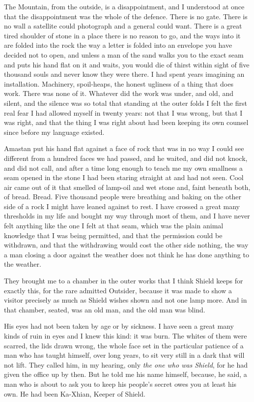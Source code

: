 The Mountain, from the outside, is a disappointment, and I understood at once that the disappointment was the whole of the defence. There is no gate. There is no wall a satellite could photograph and a general could want. There is a great tired shoulder of stone in a place there is no reason to go, and the ways into it are folded into the rock the way a letter is folded into an envelope you have decided not to open, and unless a man of the sand walks you to the exact seam and puts his hand flat on it and waits, you would die of thirst within sight of five thousand souls and never know they were there. I had spent years imagining an installation. Machinery, spoil-heaps, the honest ugliness of a thing that does work. There was none of it. Whatever did the work was under, and old, and silent, and the silence was so total that standing at the outer folds I felt the first real fear I had allowed myself in twenty years: not that I was wrong, but that I was right, and that the thing I was right about had been keeping its own counsel since before my language existed.\par

Amastan put his hand flat against a face of rock that was in no way I could see different from a hundred faces we had passed, and he waited, and did not knock, and did not call, and after a time long enough to teach me my own smallness a seam opened in the stone I had been staring straight at and had not seen. Cool air came out of it that smelled of lamp-oil and wet stone and, faint beneath both, of bread. Bread. Five thousand people were breathing and baking on the other side of a rock I might have leaned against to rest. I have crossed a great many thresholds in my life and bought my way through most of them, and I have never felt anything like the one I felt at that seam, which was the plain animal knowledge that I was being permitted, and that the permission could be withdrawn, and that the withdrawing would cost the other side nothing, the way a man closing a door against the weather does not think he has done anything to the weather.\par

They brought me to a chamber in the outer works that I think Shield keeps for exactly this, for the rare admitted Outsider, because it was made to show a visitor precisely as much as Shield wishes shown and not one lamp more. And in that chamber, seated, was an old man, and the old man was blind.\par

His eyes had not been taken by age or by sickness. I have seen a great many kinds of ruin in eyes and I knew this kind: it was burn. The whites of them were scarred, the lids drawn wrong, the whole face set in the particular patience of a man who has taught himself, over long years, to sit very still in a dark that will not lift. They called him, in my hearing, only \emph{the one who was Shield}, for he had given the office up by then. But he told me his name himself, because, he said, a man who is about to ask you to keep his people's secret owes you at least his own. He had been Ka-Xhian, Keeper of Shield.\par

